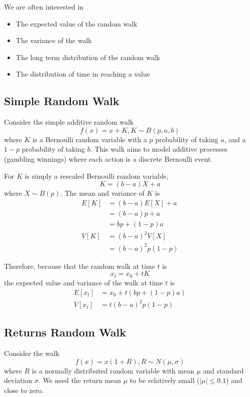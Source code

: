 \documentclass[11pt]{article}
\begin{document}
We are often interested in
\begin{itemize}
    \item The expected value of the random walk
    \item The variance of the walk
    \item The long term distribution of the random walk
    \item The distribution of time in reaching a value
\end{itemize}

\subsection{Simple Random Walk}
Consider the simple additive random walk
\[
    f(x) = x + K, K \sim B(p, a, b)
\]
where $K$ is a Bernoulli random variable with a $p$ probability of taking $a$, and a $1-p$ probability of taking $b$. This walk aims to model additive processes (gambling winnings) where each action is a discrete Bernoulli event.

For $K$ is simply a rescaled Bernoulli random variable,
\[
    K = (b-a) X + a
\]
where $X \sim B(p)$. The mean and variance of $K$ is
\begin{align*}
    E[K] &= (b-a) E[X] + a\\
    &= (b-a) p + a\\
    &= bp + (1-p) a\\
    V[K] &= (b-a)^2 V[X]\\
    &= (b-a)^2 p(1-p)
\end{align*}

Therefore, because that the random walk at time $t$ is
\[
    x_t = x_0 + t K
\]
the expected value and variance of the walk at time $t$ is
\begin{align*}
    E[x_t] &= x_0 + t (bp + (1-p)a)\\
    V[x_t] &= t (b-a)^2 p (1-p)
\end{align*}


\subsection{Returns Random Walk}
Consider the walk
\[
    f(x) = x(1+R), R \sim N(\mu, \sigma)
\]
where $R$ is a normally distributed random variable with mean $\mu$ and standard deviation $\sigma$. We need the return mean $\mu$ to be relatively small ($|\mu| \le 0.1$) and close to zero.
\end{document}
